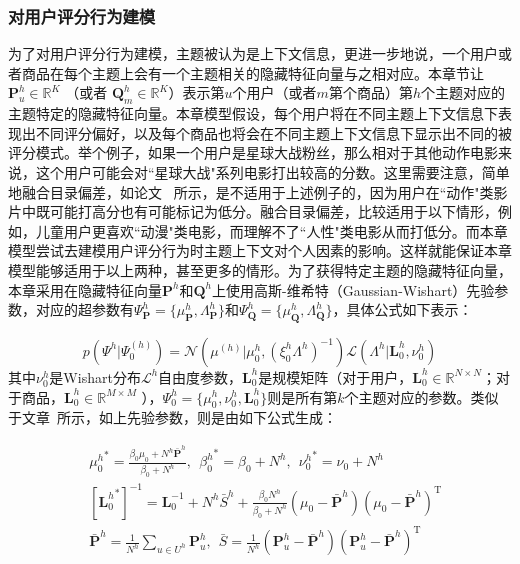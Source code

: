 \subsubsection{对用户评分行为建模} 
为了对用户评分行为建模，主题被认为是上下文信息，更进一步地说，一个用户或者商品在每个主题上会有一个主题相关的隐藏特征向量与之相对应。本章节让$\mathbf{P}_u^{h}\in \mathbb{R}^K$ （或者 $\mathbf{Q}_m^{h}\in \mathbb{R}^K$）表示第$u$个用户（或者$m$第个商品）第$h$个主题对应的主题特定的隐藏特征向量。本章模型假设，每个用户将在不同主题上下文信息下表现出不同评分偏好，以及每个商品也将会在不同主题上下文信息下显示出不同的被评分模式。举个例子，如果一个用户是星球大战粉丝，那么相对于其他动作电影来说，这个用户可能会对``星球大战"系列电影打出较高的分数。这里需要注意，简单地融合目录偏差，如论文~\cite{mirbakhsh2013clustering,hu2014your} 所示，是不适用于上述例子的，因为用户在``动作"类影片中既可能打高分也有可能标记为低分。融合目录偏差，比较适用于以下情形，例如，儿童用户更喜欢``动漫"类电影，而理解不了``人性"类电影从而打低分。而本章模型尝试去建模用户评分行为时主题上下文对个人因素的影响。这样就能保证本章模型能够适用于以上两种，甚至更多的情形。为了获得特定主题的隐藏特征向量，本章采用在隐藏特征向量$\mathbf{P}^{h}$和$\mathbf{Q}^{h}$上使用高斯-维希特（Gaussian-Wishart）先验参数，对应的超参数有$\Psi_{\mathbf{P}}^{h}=\{\mu_{\mathbf{P}}^{h}, \Lambda_{\mathbf{P}}^{h}\}$和$\Psi_{\mathbf{Q}}^{h}=\{\mu_{\mathbf{Q}}^{h}, \Lambda_{\mathbf{Q}}^{h}\}$，具体公式如下表示：

\begin{equation}
	\label{eq-bpmtmf-wishart}
	p(\Psi^{h}|\Psi_0^{(h)}) = \mathcal{N}(\mu^{(h)}|\mu_0^{h},(\xi_0^{h} \Lambda^{h})^{-1})\mathcal{L}(\Lambda^{h}|\mathbf{L}_0^{h},\nu_0^{h})
\end{equation}
其中$\nu_0^{h}$是Wishart分布$\mathcal{L}^{h}$自由度参数，$\mathbf{L}_0^{h}$是规模矩阵（对于用户，$\mathbf{L}_0^{h}\in \mathbb{R}^{N\times N}$；对于商品，$\mathbf{L}_0^{h}\in \mathbb{R}^{M\times M}$ ），$\Psi_0^{h} = \{\mu_0^{h},\nu_0^{h},\mathbf{L}_0^{h}\}$则是所有第$k$个主题对应的参数。类似于文章~\cite{salakhutdinov2008bayesian}所示，如上先验参数，则是由如下公式生成：

\begin{align*}
&{\mu_0^{h}}^\ast = \frac{\beta_0 \mu_0+N^{h} \bar{\mathbf{P}}^{h}}{\beta_0+N^{h}},\ \ {\beta_0^{h}}^\ast = \beta_0+N^{h},\ \ {\nu_0^{h}}^\ast = \nu_0+N^{h}\\
& [{\mathbf{L}_0^{h}}^\ast]^{-1} = \mathbf{L}_0^{-1}+N^{h}\bar{S}^{h}+\frac{\beta_0N^{h}}{\beta_0+N^{h}}(\mu_0-\bar{\mathbf{P}}^{h})(\mu_0-\bar{\mathbf{P}}^{h})^\mathrm{ T }\\
&\bar{\mathbf{P}}^{h}=\frac{1}{N^{h}}\sum_{u\in U^{h}}\mathbf{P}_u^{h},\ \ \bar{S}=\frac{1}{N^{h}}(\mathbf{P}_u^{h}-\bar{\mathbf{P}}^{h})(\mathbf{P}_u^{h}-\bar{\mathbf{P}}^{h})^\mathrm{ T }
\end{align*}


